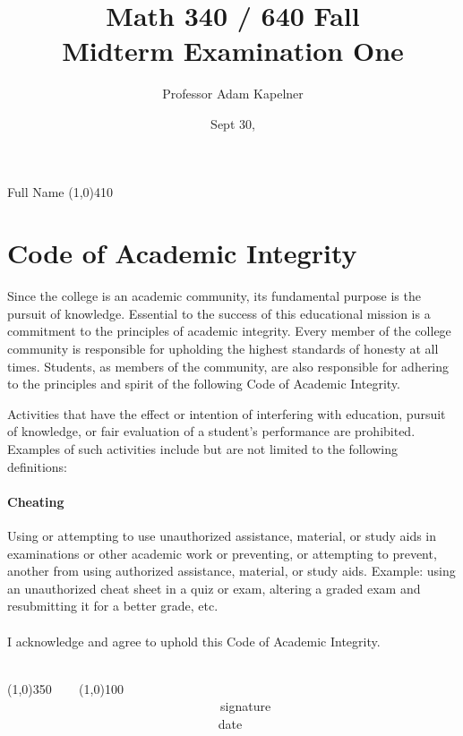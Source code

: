 \documentclass[12pt]{article}
\title{Math 340 / 640 Fall \the\year{} \\ Midterm Examination One}
\author{Professor Adam Kapelner}
\date{Sept 30, \the\year{}}
\begin{document}
\maketitle

\noindent Full Name \line(1,0){410}

\thispagestyle{empty}

\section*{Code of Academic Integrity}

\footnotesize
Since the college is an academic community, its fundamental purpose is the pursuit of knowledge. Essential to the success of this educational mission is a commitment to the principles of academic integrity. Every member of the college community is responsible for upholding the highest standards of honesty at all times. Students, as members of the community, are also responsible for adhering to the principles and spirit of the following Code of Academic Integrity.

Activities that have the effect or intention of interfering with education, pursuit of knowledge, or fair evaluation of a student's performance are prohibited. Examples of such activities include but are not limited to the following definitions:

\paragraph{Cheating} Using or attempting to use unauthorized assistance, material, or study aids in examinations or other academic work or preventing, or attempting to prevent, another from using authorized assistance, material, or study aids. Example: using an unauthorized cheat sheet in a quiz or exam, altering a graded exam and resubmitting it for a better grade, etc.\\
\\
\noindent I acknowledge and agree to uphold this Code of Academic Integrity. \\~\\

\begin{center}
\line(1,0){350} ~~~ \line(1,0){100}\\
~~~~~~~~~~~~~~~~~~~~~~~~~~~~~~~~~~signature~~~~~~~~~~~~~~~~~~~~~~~~~~~~~~~~~~~~~~~~~~~~~~~~~~~~~~~~~~~~~~ date
\end{center}

\normalsize
\end{document}
